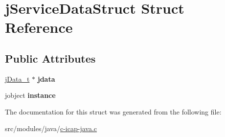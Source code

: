 \hypertarget{structj_service_data_struct}{\section{j\+Service\+Data\+Struct Struct Reference}
\label{structj_service_data_struct}
}
\subsection*{Public Attributes}
\begin{DoxyCompactItemize}
\item 
\hypertarget{structj_service_data_struct_ae367f2982c992b076f4c9a322d42f384}{\hyperlink{structj_data_struct}{j\+Data\+\_\+t} $\ast$ {\bfseries jdata}}\label{structj_service_data_struct_ae367f2982c992b076f4c9a322d42f384}

\item 
\hypertarget{structj_service_data_struct_a14331419cd29a84e008d3029610b2969}{jobject {\bfseries instance}}\label{structj_service_data_struct_a14331419cd29a84e008d3029610b2969}

\end{DoxyCompactItemize}


The documentation for this struct was generated from the following file\+:\begin{DoxyCompactItemize}
\item 
src/modules/java/\hyperlink{c-icap-java_8c}{c-\/icap-\/java.\+c}\end{DoxyCompactItemize}
